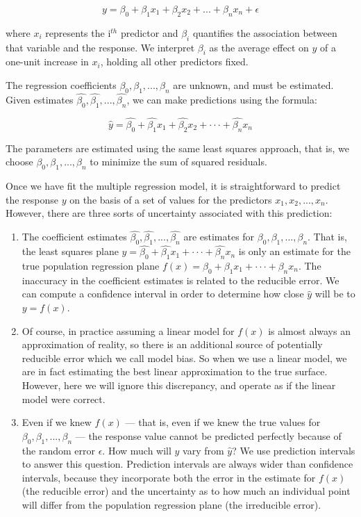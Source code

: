 \begin{equation}
    y = \beta_0 + \beta_1 x_1 + \beta_2 x_2 + ... + \beta_n x_n + \epsilon
\end{equation}

where $x_i$ represents the i$^{th}$ predictor and $\beta_i$ quantifies the association between that
variable and the response. We interpret $\beta_i$ as the average effect on $y$ of a one-unit
increase in $x_i$, holding all other predictors fixed.

The regression coefficients $\beta_0, \beta_1, ..., \beta_n$ are unknown, and must be estimated.
Given estimates $\hat{\beta_0}, \hat{\beta_1}, ..., \hat{\beta_n}$, we can make predictions using
the formula:

\begin{equation}
    \hat{y} = \hat{\beta_0} + \hat{\beta_1} x_1 + \hat{\beta_2} x_2 + ··· + \hat{\beta_n} x_n
\end{equation}

The parameters are estimated using the same least squares approach, that is, we choose $\beta_0,
\beta_1, ..., \beta_n$ to minimize the sum of squared residuals.

Once we have fit the multiple regression model, it is straightforward to predict the response $y$ on
the basis of a set of values for the predictors $x_1, x_2, ..., x_n$. However, there are three sorts
of uncertainty associated with this prediction:

\begin{enumerate}
    \item The coefficient estimates $\hat{\beta_0}, \hat{\beta_1}, ..., \hat{\beta_n}$ are estimates
for $\beta_0, \beta_1, ..., \beta_n$. That is, the least squares plane $\hat{y} = \hat{\beta_0} +
\hat{\beta_1} x_1 + ··· + \hat{\beta_n} x_n$ is only an estimate for the true population regression
plane $f(x) = \beta_0 + \beta_1 x_1 + ··· + \beta_n x_n$. The inaccuracy in the coefficient
estimates is related to the reducible error. We can compute a confidence interval in order to
determine how close $\hat{y}$ will be to $y = f(x)$.

    \item Of course, in practice assuming a linear model for $f(x)$ is almost always an
approximation of reality, so there is an additional source of potentially reducible error which we
call model bias. So when we use a linear model, we are in fact estimating the best linear
approximation to the true surface. However, here we will ignore this discrepancy, and operate as if
the linear model were correct.

    \item Even if we knew $f(x)$ --- that is, even if we knew the true values for $\beta_0, \beta_1,
..., \beta_n$ --- the response value cannot be predicted perfectly because of the random error
$\epsilon$. How much will $y$ vary from $\hat{y}$? We use prediction intervals to answer this
question. Prediction intervals are always wider than confidence intervals, because they incorporate
both the error in the estimate for $f(x)$ (the reducible error) and the uncertainty as to how much
an individual point will differ from the population regression plane (the irreducible error).
\end{enumerate}
